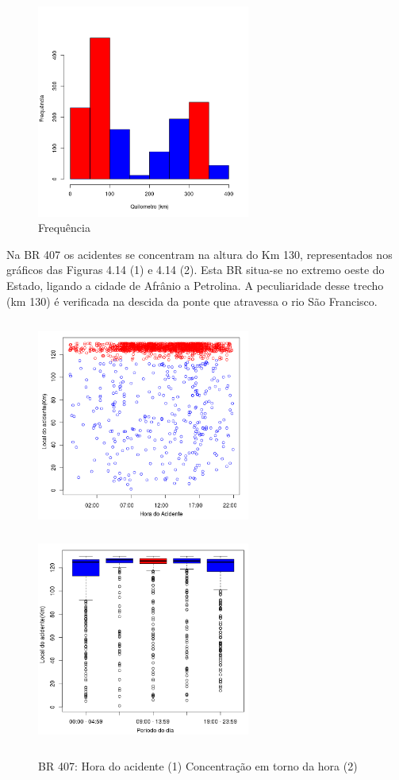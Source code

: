 \quad \quad
\begin{figure}[h]
	\centering
	\caption{ Frequência}
	\includegraphics[width=7cm,height=7cm]{Figuras/Preprocess/br316_3.png}
\end{figure}



\pagebreak

Na BR 407 os acidentes se concentram na altura do Km 130, representados nos gráficos das Figuras 4.14 (1) e 4.14 (2).
Esta BR situa-se no extremo oeste do Estado, ligando a cidade de Afrânio a Petrolina. A peculiaridade desse trecho (km 130) é verificada na descida da ponte que atravessa o rio São Francisco.

\begin{figure}[h]
	\caption{BR 407: Hora do acidente (1) Concentração em torno da hora (2)}
	\includegraphics[width=7cm,height=7cm]{Figuras/Preprocess/br407_1.png}
	\includegraphics[width=7cm,height=7cm]{Figuras/Preprocess/br407_3.png}

\end{figure}

